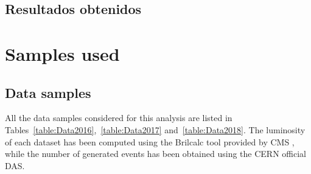 \documentclass[a4paper, 10pt, openright]{report}
\begin{document}
\begin{appendices}
\section{Resultados obtenidos}







\chapter{Samples used} \label{appendix:Samples}
\section{Data samples} \label{appendix:DataSamples}

All the data samples considered for this analysis are listed in Tables~\ref{table:Data2016},~\ref{table:Data2017} and~\ref{table:Data2018}. The luminosity of each dataset has been computed using the Brilcalc tool provided by \ac{CMS} \cite{Brilcalc}, while the number of generated events has been obtained using the CERN official \acf{DAS}.


\end{appendices}
\end{document}

